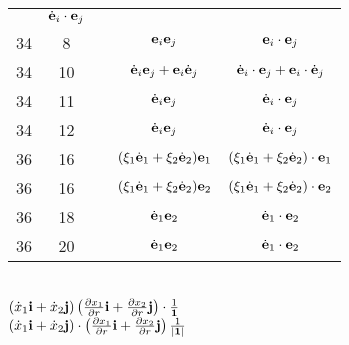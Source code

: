 \documentclass[a4paper,11pt]{article}
\begin{document}
\begin{center}
\begin{tabular}{|c|c|c|c|c|}
           & $\dot{ \mathbf{e} }_{ i } \cdot \mathbf{e}_{ j }$ \\
    34  &  8 & & $\mathbf{e}_{ i } \mathbf{e}_{ j }$
           & $\mathbf{e}_{ i } \cdot \mathbf{e}_{ j }$ \\
    34  & 10 & & $\dot{ \mathbf{e} }_{ i } \mathbf{e}_{ j }
                 + \mathbf{e}_{ i } \dot{ \mathbf{e} }_{ j }$
           & $\dot{ \mathbf{e} }_{ i } \cdot \mathbf{e}_{ j }
             + \mathbf{e}_{ i } \cdot \dot{ \mathbf{e} }_{ j }$ \\
    34  & 11 & & $\dot{ \mathbf{e} }_{ i } \mathbf{e}_{ j }$
           & $\dot{ \mathbf{e} }_{ i } \cdot \mathbf{e}_{ j }$ \\
    34  & 12 & & $\dot{ \mathbf{e} }_{ i } \mathbf{e}_{ j }$
           & $\dot{ \mathbf{e} }_{ i } \cdot \mathbf{e}_{ j }$ \\
    36  & 16 & & $( \xi_{ 1 } \dot{ \mathbf{e} }_{ 1 }
                 + \xi_{ 2 } \dot{ \mathbf{e} }_{ 2 }  ) \mathbf{e}_{ 1 }$
           & $( \xi_{ 1 } \dot{ \mathbf{e} }_{ 1 }
             + \xi_{ 2 } \dot{ \mathbf{e} }_{ 2 }  ) \cdot \mathbf{e}_{ 1 }$ \\
    36  & 16 & & $( \xi_{ 1 } \dot{ \mathbf{e} }_{ 1 }
                 + \xi_{ 2 } \dot{ \mathbf{e} }_{ 2 }  ) \mathbf{e}_{ 2 }$
           & $( \xi_{ 1 } \dot{ \mathbf{e} }_{ 1 }
             + \xi_{ 2 } \dot{ \mathbf{e} }_{ 2 }  ) \cdot \mathbf{e}_{ 2 }$ \\
    36  & 18 & & $\dot{ \mathbf{e} }_{ 1 } \mathbf{e}_{ 2 }$
           & $\dot{ \mathbf{e} }_{ 1 } \cdot \mathbf{e}_{ 2 }$ \\
    36  & 20 & & $\dot{ \mathbf{e} }_{ 1 } \mathbf{e}_{ 2 }$
           & $\dot{ \mathbf{e} }_{ 1 } \cdot \mathbf{e}_{ 2 }$ \\
    \hline
  \end{tabular}

\end{center}


\noindent
{} \\[0.3em]
\Jest
$( \dot{ x }_{ 1 } \mathbf{i} + \dot{ x }_{ 2 } \mathbf{j} )
\left( \frac{ \partial x_{ 1 } }{ \partial r } \mathbf{i}
  + \frac{ \partial x_{ 2 } }{ \partial r } \mathbf{j} \right)
\cdot \frac{ 1 }{ \mathbf{1} }$ \\[0.5em]
\Powin
$( \dot{ x }_{ 1 } \mathbf{i} + \dot{ x }_{ 2 } \mathbf{j} )
\cdot \left( \frac{ \partial x_{ 1 } }{ \partial r } \mathbf{i}
  + \frac{ \partial x_{ 2 } }{ \partial r } \mathbf{j} \right)
\frac{ 1 }{ | \mathbf{1} | }$ \\
\end{document}
